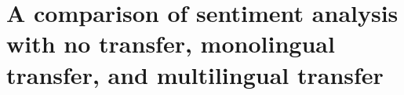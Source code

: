 \chapter{A comparison of sentiment analysis with no transfer, monolingual transfer, and multilingual transfer}\label{chapter:multilingual_sentiment_analysis}
